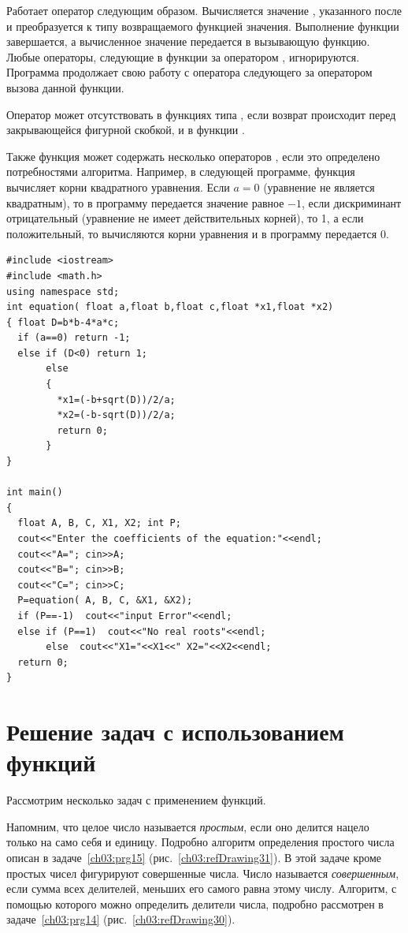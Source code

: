 Работает оператор следующим образом. Вычисляется значение , указанного после
 и преобразуется к типу возвращаемого функцией значения. Выполнение функции завершается, а
вычисленное значение передается в вызывающую функцию. Любые операторы, следующие в функции за оператором
, игнорируются. Программа продолжает свою работу с оператора следующего за оператором вызова
данной функции.

Оператор  может отсутствовать в функциях типа , если возврат происходит
перед закрывающейся фигурной скобкой, и в функции .

Также функция может содержать несколько операторов , если это определено потребностями
алгоритма. Например, в следующей программе, функция  вычисляет корни квадратного уравнения.
Если $a=0$ (уравнение не является квадратным), то в программу передается значение равное
$-1$, если дискриминант отрицательный (уравнение не имеет действительных корней), то
1, а если положительный, то  вычисляются корни уравнения и в программу передается 0.
\begin{lstlisting}
#include <iostream>
#include <math.h>
using namespace std;
int equation( float a,float b,float c,float *x1,float *x2)
{ float D=b*b-4*a*c;
  if (a==0) return -1;
  else if (D<0) return 1;
       else 
       {
         *x1=(-b+sqrt(D))/2/a;
         *x2=(-b-sqrt(D))/2/a;
         return 0;
       }
}

int main()
{
  float A, B, C, X1, X2; int P;
  cout<<"Enter the coefficients of the equation:"<<endl;
  cout<<"A="; cin>>A;
  cout<<"B="; cin>>B;
  cout<<"C="; cin>>C;
  P=equation( A, B, C, &X1, &X2);
  if (P==-1)  cout<<"input Error"<<endl;
  else if (P==1)  cout<<"No real roots"<<endl;
       else  cout<<"X1="<<X1<<" X2="<<X2<<endl;
  return 0;
}
\end{lstlisting}

\section[Решение задач с использованием функций]{Решение задач с использованием функций}
Рассмотрим несколько задач с применением функций.


Напомним, что целое число называется \emph{простым}, если оно делится нацело только на само себя и единицу.
Подробно алгоритм определения простого числа описан в задаче~\ref{ch03:prg15} (рис.~\ref{ch03:refDrawing31}). 
В этой задаче кроме простых чисел
фигурируют совершенные числа. Число называется \emph{совершенным}, если сумма всех делителей, меньших его
самого равна этому числу. Алгоритм, с помощью которого можно определить делители числа, подробно рассмотрен 
в задаче~\ref{ch03:prg14} (рис.~\ref{ch03:refDrawing30}).


